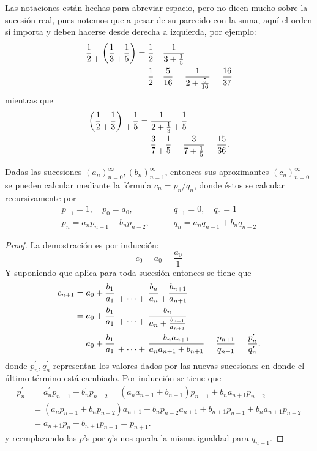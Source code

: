 \documentclass[teoria-numeros.tex]{subfiles}
\begin{document}
Las notaciones están hechas para abreviar espacio, pero no dicen mucho sobre la sucesión real, pues notemos que a pesar de su parecido con la suma,
aquí el orden sí importa y deben hacerse desde derecha a izquierda, por ejemplo:
\begin{align*}
	\frac{1}{2} {\atop +} \left( \frac{1}{3} {\atop +} \frac{1}{5} \right) &= \frac{1}{2} {\atop +} \frac{1}{3 + \frac{1}{5}} \\
									       &= \frac{1}{2} {\atop +} \frac{5}{16} = \frac{1}{2 + \frac{5}{16}} = \frac{16}{37}
\end{align*}
mientras que
\begin{align*}
	\left( \frac{1}{2} {\atop +} \frac{1}{3} \right) {\atop +} \frac{1}{5} &= \frac{1}{2 + \frac{1}{3}} {\atop +} \frac{1}{5} \\
									       &= \frac{3}{7} {\atop +} \frac{1}{5} = \frac{3}{7 + \frac{1}{5}} = \frac{15}{36}.
\end{align*}

\begin{thm}
	Dadas las sucesiones $(a_n)_{n=0}^\infty, (b_n)_{n=1}^\infty$, entonces sus aproximantes $(c_n)_{n=0}^\infty$ se pueden
	calcular mediante la fórmula $c_n = p_n/q_n$, donde éstos se calcular recursivamente por
	\begin{align*}
		p_{-1} = 1, \quad p_0 = a_0, &\qquad q_{-1} = 0, \quad q_0 = 1 \\
		p_n = a_np_{n-1} + b_np_{n-2}, &\qquad q_n = a_nq_{n-1} + b_nq_{n-2}
	\end{align*}
\end{thm}
\begin{proof}
	La demostración es por inducción:
	$$ c_0 = a_0 = \frac{a_0}{1} $$
	Y suponiendo que aplica para toda sucesión entonces se tiene que
	\begin{align*}
		c_{n+1} &= a_0 + \frac{b_1}{a_1} {\atop {}+\cdots+{}} \frac{b_n}{a_n} {\atop +} \frac{b_{n+1}}{a_{n+1}} \\
			&= a_0 + \frac{b_1}{a_1} {\atop {}+\cdots+{}} \frac{b_n}{a_n + \frac{b_{n+1}}{a_{n+1}}} \\
			&= a_0 + \frac{b_1}{a_1} {\atop {}+\cdots+{}} \frac{b_na_{n+1}}{a_na_{n+1} + b_{n+1}} = \frac{p_{n+1}}{q_{n+1}} = \frac{p^\prime_n}{q^\prime_n}.
	\end{align*}
	donde $p^\prime_n, q^\prime_n$ representan los valores dados por las nuevas sucesiones en donde el último término está cambiado.
	Por inducción se tiene que
	\begin{align*}
		p^\prime_n &= a^\prime_n p_{n-1} + b^\prime_n p_{n-2} = (a_n a_{n+1} + b_{n+1})p_{n-1} + b_na_{n+1}p_{n-2} \\
			   &= ( a_np_{n-1} + b_np_{n-2} ) a_{n+1} - b_np_{n-2}a_{n+1} + b_{n+1}p_{n-1} + b_na_{n+1}p_{n-2} \\
			   &= a_{n+1}p_n + b_{n+1}p_{n-1} = p_{n+1}.
	\end{align*}
	y reemplazando las $p$'s por $q$'s nos queda la misma igualdad para $q_{n+1}$.
\end{proof}
\end{document}
